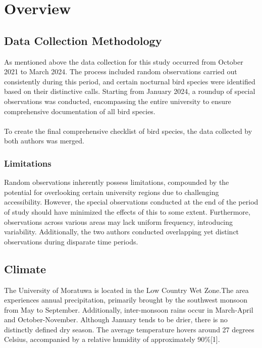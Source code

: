 \chapter{Overview}
\label{cp:overview}
\section{Data Collection Methodology}
As mentioned above the data collection for this study occurred from October 2021 to March 2024. The process included random observations carried out consistently during this period, and certain nocturnal bird species were identified based on their distinctive calls. Starting from January 2024, a roundup of special observations was conducted, encompassing the entire university to ensure comprehensive documentation of all bird species.
\\\\
To create the final comprehensive checklist of bird species, the data collected by both authors was merged.

\begin{importantbox}
\subsection{Limitations}
 Random observations inherently possess limitations, compounded by the potential for overlooking certain university regions due to challenging accessibility. However, the special observations conducted at the end of the period of study should have minimized the effects of this to some extent. Furthermore, observations across various areas may lack uniform frequency, introducing variability. Additionally, the two authors conducted overlapping yet distinct observations during disparate time periods.
\end{importantbox}

\section{Climate}
The University of Moratuwa is located in the Low Country Wet Zone.The area experiences annual precipitation, primarily brought by the southwest monsoon from May to September. Additionally, inter-monsoon rains occur in March-April and October-November. Although January tends to be drier, there is no distinctly defined dry season. The average temperature hovers around 27 degrees Celsius, accompanied by a relative humidity of approximately 90\%[1].

